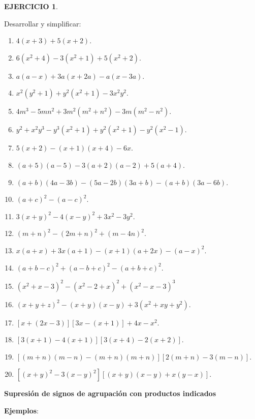 \documentclass[12pt,letterpaper]{article}
\theoremstyle{definition}
\newtheorem{ejer}{EJERCICIO}
\begin{document}
\vspace{1mm}

\begin{ejer}\

Desarrollar y simplificar: %
\begin{enumerate}
\item $4(x+3)+5(x+2)$.
\item $6(x^2+4)-3(x^2+1)+5(x^2+2)$.
\item $a(a-x)+3a(x+2a)-a(x-3a)$.
\item $x^2(y^2+1)+y^2(x^2+1)-3x^2y^2$.
\item $4m^3-5mn^2+3m^2(m^2+n^2)-3m(m^2-n^2)$.
\item $y^2+x^2y^3-y^3(x^2+1)+y^2(x^2+1)-y^2(x^2-1)$.
\item $5(x+2)-(x+1)(x+4)-6x$.
\item $(a+5)(a-5)-3(a+2)(a-2)+5(a+4)$.
\item $(a+b)(4a-3b)-(5a-2b)(3a+b)-(a+b)(3a-6b)$.
\item $(a+c)^2-(a-c)^2$.
\item $3(x+y)^2-4(x-y)^2+3x^2-3y^2$.
\item $(m+n)^2-(2m+n)^2+(m-4n)^2$.
\item $x(a+x)+3x(a+1)-(x+1)(a+2x)-(a-x)^2$.
\item $(a+b-c)^2+(a-b+c)^2-(a+b+c)^2$.
\item $(x^2+x-3)^2-(x^2-2+x)^2+(x^2-x-3)^3$
\item $(x+y+z)^2-(x+y)(x-y)+3(x^2+xy+y^2)$.
\item $[x+(2x-3)][3x-(x+1)]+4x-x^2$.
\item $[3(x+1)-4(x+1)][3(x+4)-2(x+2)]$.
\item $[(m+n)(m-n)-(m+n)(m+n)][2(m+n)-3(m-n)]$.
\item $[(x+y)^2-3(x-y)^2][(x+y)(x-y)+x(y-x)]$.
\end{enumerate}
\end{ejer}

\vspace{1mm}

\textbf{Supresión de signos de agrupación con productos indicados} %

\textbf{Ejemplos}:
\end{document}
